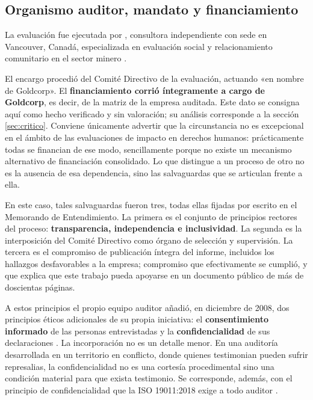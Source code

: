 \subsection{Organismo auditor, mandato y financiamiento}

La evaluación fue ejecutada por \auditora, consultora independiente con sede en
Vancouver, Canadá, especializada en evaluación social y relacionamiento
comunitario en el sector minero \parencite{oncommonground2010hria}.

El encargo procedió del Comité Directivo de la evaluación, actuando «en nombre de
Goldcorp». El \textbf{financiamiento corrió íntegramente a cargo de Goldcorp}, es
decir, de la matriz de la empresa auditada. Este dato se consigna aquí como hecho
verificado y sin valoración; su análisis corresponde a la sección
\ref{sec:critico}. Conviene únicamente advertir que la circunstancia no es
excepcional en el ámbito de las evaluaciones de impacto en derechos humanos:
prácticamente todas se financian de ese modo, sencillamente porque no existe un
mecanismo alternativo de financiación consolidado. Lo que distingue a un proceso
de otro no es la ausencia de esa dependencia, sino las salvaguardas que se
articulan frente a ella.

En este caso, tales salvaguardas fueron tres, todas ellas fijadas por escrito en el
Memorando de Entendimiento. La primera es el conjunto de principios rectores del
proceso: \textbf{transparencia, independencia e inclusividad}. La segunda es la
interposición del Comité Directivo como órgano de selección y supervisión. La
tercera es el compromiso de publicación íntegra del informe, incluidos los
hallazgos desfavorables a la empresa; compromiso que efectivamente se cumplió, y
que explica que este trabajo pueda apoyarse en un documento público de más de
doscientas páginas.

A estos principios el propio equipo auditor añadió, en diciembre de 2008, dos
principios éticos adicionales de su propia iniciativa: el \textbf{consentimiento
informado} de las personas entrevistadas y la \textbf{confidencialidad} de sus
declaraciones \parencite{oncommonground2010hria}. La incorporación no es un
detalle menor. En una auditoría desarrollada en un territorio en conflicto, donde
quienes testimonian pueden sufrir represalias, la confidencialidad no es una
cortesía procedimental sino una condición material para que exista testimonio. Se
corresponde, además, con el principio de confidencialidad que la ISO 19011:2018
exige a todo auditor \parencite{iso2018iso19011}.

